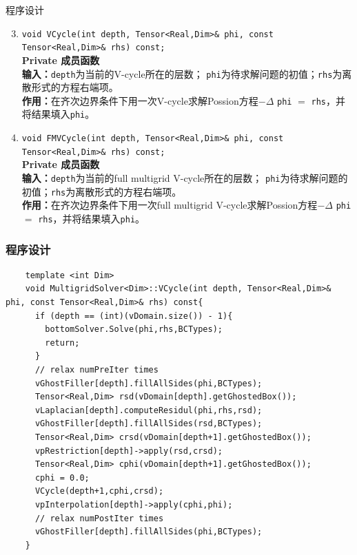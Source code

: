 \documentclass{beamer}
\begin{document}
\begin{frame}{程序设计}
  \begin{enumerate}[(1)] \setcounter{enumi}{2}
                    \item \texttt{void VCycle(int depth, Tensor<Real,Dim>\& phi, const Tensor<Real,Dim>\&
              rhs) const;}\\
          \textbf{Private 成员函数}\\
          \textbf{输入：}\texttt{depth}为当前的V-cycle所在的层数；
          \texttt{phi}为待求解问题的初值；\texttt{rhs}为离散形式的方程右端项。\\
          \textbf{作用：}在齐次边界条件下用一次V-cycle求解Possion方程$-\Delta$ \texttt{phi} $=$
          \texttt{rhs}，并将结果填入\texttt{phi}。
          \item \texttt{void FMVCycle(int depth, Tensor<Real,Dim>\& phi, const Tensor<Real,Dim>\&
               rhs) const;}\\
          \textbf{Private 成员函数}\\
          \textbf{输入：}\texttt{depth}为当前的full multigrid V-cycle所在的层数；
          \texttt{phi}为待求解问题的初值；\texttt{rhs}为离散形式的方程右端项。\\
          \textbf{作用：}在齐次边界条件下用一次full multigrid V-cycle求解Possion方程$-\Delta$ \texttt{phi} $=$
          \texttt{rhs}，并将结果填入\texttt{phi}。
        \end{enumerate}

\end{frame}
\begin{frame}[fragile]
  \frametitle{程序设计}
  \scriptsize
  \begin{lstlisting}
    template <int Dim>
    void MultigridSolver<Dim>::VCycle(int depth, Tensor<Real,Dim>& phi, const Tensor<Real,Dim>& rhs) const{
      if (depth == (int)(vDomain.size()) - 1){
        bottomSolver.Solve(phi,rhs,BCTypes);
        return;
      }
      // relax numPreIter times
      vGhostFiller[depth].fillAllSides(phi,BCTypes);
      Tensor<Real,Dim> rsd(vDomain[depth].getGhostedBox());
      vLaplacian[depth].computeResidul(phi,rhs,rsd);
      vGhostFiller[depth].fillAllSides(rsd,BCTypes);
      Tensor<Real,Dim> crsd(vDomain[depth+1].getGhostedBox());
      vpRestriction[depth]->apply(rsd,crsd);
      Tensor<Real,Dim> cphi(vDomain[depth+1].getGhostedBox());
      cphi = 0.0;
      VCycle(depth+1,cphi,crsd);
      vpInterpolation[depth]->apply(cphi,phi);
      // relax numPostIter times
      vGhostFiller[depth].fillAllSides(phi,BCTypes);
    }
  \end{lstlisting}
\end{frame}
\end{document}
